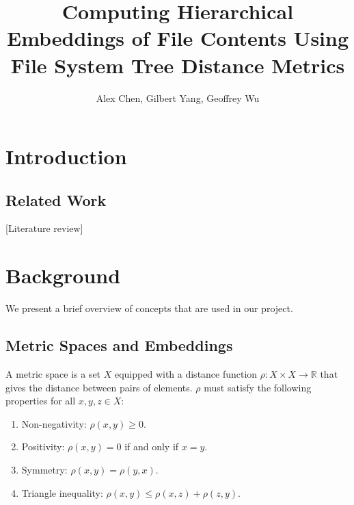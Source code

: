 \documentclass{article}
\title{Computing Hierarchical Embeddings of File Contents Using File System Tree Distance Metrics}
\author{Alex Chen, Gilbert Yang, Geoffrey Wu}
\begin{document}
\maketitle




\section{Introduction}

\subsection{Related Work}

[Literature review]

\section{Background}

We present a brief overview of concepts that are used in our project.

\subsection{Metric Spaces and Embeddings}

A metric space is a set $X$ equipped with a distance function $\rho: X \times X \rightarrow \mathbb{R}$ that gives the distance between pairs of elements. $\rho$ must satisfy the following properties for all $x,y,z \in X$:

\begin{enumerate}
  \item Non-negativity: $\rho(x,y) \geq 0$.
  \item Positivity: $\rho(x,y) = 0$ if and only if $x = y$.
  \item Symmetry: $\rho(x,y) = \rho(y,x)$.
  \item Triangle inequality: $\rho(x,y) \leq \rho(x,z) + \rho(z,y)$.
\end{enumerate}
\end{document}
